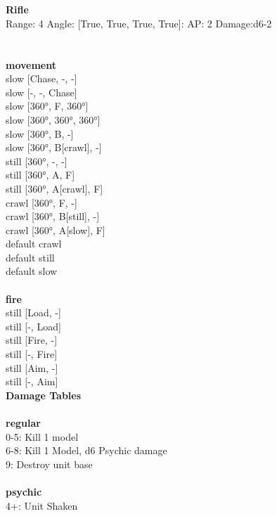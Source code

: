 \ \\

\ \\
{\bf Rifle } \\



Range: 4  Angle: [True, True, True, True]: AP: 2 Damage:d6-2 \\




 
\ \\



\ \\ {\bf movement } \\
slow [Chase, -, -] \\
slow [-, -, Chase] \\
slow [360°, F, 360°] \\
slow [360°, 360°, 360°] \\
slow [360°, B, -] \\
slow [360°, B[crawl], -] \\
still [360°, -, -] \\
still [360°, A, F] \\
still [360°, A[crawl], F] \\
crawl [360°, F, -] \\
crawl [360°, B[still], -] \\
crawl [360°, A[slow], F] \\
default crawl \\
default still \\
default slow \\
\ \\ {\bf fire } \\
still [Load, -] \\
still [-, Load] \\
still [Fire, -] \\
still [-, Fire] \\
still [Aim, -] \\
still [-, Aim] \\


{\bf Damage Tables} \\
\ \\ {\bf regular } \\
0-5: Kill 1 model \\
6-8: Kill 1 Model, d6 Psychic damage \\
9: Destroy unit base \\
\ \\ {\bf psychic } \\
4+: Unit Shaken \\










